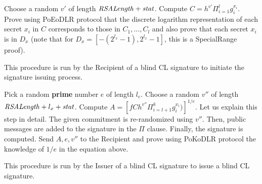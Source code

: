 \begin{algorithm}[H]\label{receiveCL}
\dontprintsemicolon

\BlankLine

 \;
\Indp
  Choose a random $v'$ of length $\mathit{RSALength} + \mathit{stat}$. \;
  Compute $C = h^{v'} \Pi_{i=1}^{l} g_{i}^{x_i}$. \;
  Prove using PoEoDLR protocol that the discrete logarithm representation of each secret $x_i$ in $C$ corresponds to those in $C_1,\ldots,C_l$ and also prove that each secret $x_i$ is in $D_x$ (note that for $D_x = [-(2^{l_x}-1) , 2^{l_x}-1]$, this is a SpecialRange proof). \;
\Indm

\caption{This procedure is run by the Recipient of a blind CL signature to initiate the signature issuing process.}
\end{algorithm}



\begin{algorithm}[H]\label{issueCL}
\dontprintsemicolon

\BlankLine

 \;
\Indp
  Pick a random \textbf{prime} number $e$ of length $l_e$. \;
  Choose a random $v''$ of length $\mathit{RSALength} + l_x + \mathit{stat}$. \;
  Compute $A = [f C h^{v''} \Pi_{i=l+1}^{k} g_{i}^{x_i})]^{1/e}$. Let us explain this step in detail. The given commitment is re-randomized using $v''$. Then, public messages are added to the signature in the $\Pi$ clause. Finally, the signature is computed. \;
  Send $A,e,v''$ to the Recipient and prove using PoKoDLR protocol the knowledge of $1/e$ in the equation above. \;
\Indm

\caption{This procedure is run by the Issuer of a blind CL signature to issue a blind CL signature.}
\end{algorithm}




